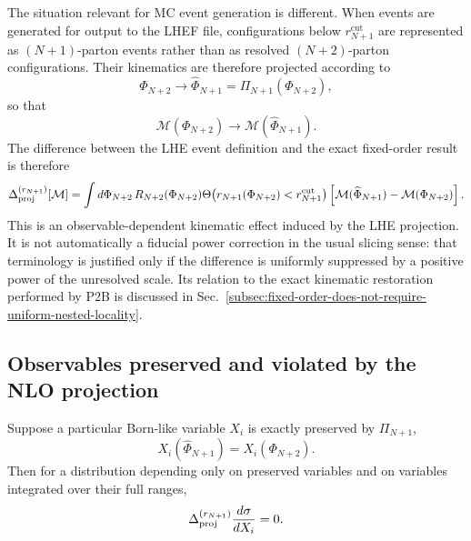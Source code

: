 \documentclass[11pt]{article}
\newcommand{\rnp}{r_{N+1}}
\newcommand{\cut}{\mathrm{cut}}
\newcommand{\Ph}{\Phi}
\newcommand{\Mcal}{\mathcal{M}}
\begin{document}
The situation relevant for MC event generation is different. When events are generated for output to
the LHEF file, configurations below \(\rnp^{\cut}\) are represented as \((N+1)\)-parton events rather
than as resolved \((N+2)\)-parton configurations. Their kinematics are therefore projected according to
\begin{equation}
\Ph_{N+2}\to\widehat\Ph_{N+1}=\Pi_{N+1}(\Ph_{N+2}),
\label{eq:rnp-projection}
\end{equation}
so that
\begin{equation}
\Mcal(\Ph_{N+2})\to\Mcal(\widehat\Ph_{N+1}).
\label{eq:rnp-measurement-replacement}
\end{equation}
The difference between the LHE event definition and the exact fixed-order result is therefore
\begin{equation}
\Delta_{\rm proj}^{(\rnp)}[\Mcal]
=
\int d\Ph_{N+2}\,
R_{N+2}(\Ph_{N+2})
\Theta\!\left(\rnp(\Ph_{N+2})<\rnp^{\cut}\right)
\left[
\Mcal(\widehat\Ph_{N+1})-\Mcal(\Ph_{N+2})
\right].
\label{eq:rnp-proj-correction}
\end{equation}
This is an observable-dependent kinematic effect induced by the LHE projection. It is not automatically a
fiducial power correction in the usual slicing sense: that terminology is justified only if the difference is
uniformly suppressed by a positive power of the unresolved scale. Its relation to the exact kinematic
restoration performed by P2B is discussed in
Sec.~\ref{subsec:fixed-order-does-not-require-uniform-nested-locality}.

\subsection{Observables preserved and violated by the NLO projection}

Suppose a particular Born-like variable \(X_i\) is exactly preserved by \(\Pi_{N+1}\),
\begin{equation}
X_i(\widehat\Ph_{N+1})=X_i(\Ph_{N+2}).
\label{eq:x-preserved}
\end{equation}
Then for a distribution depending only on preserved variables and on variables integrated over their full ranges,
\begin{equation}
\Delta_{\rm proj}^{(\rnp)}
\frac{d\sigma}{dX_i}=0.
\label{eq:x-preserved-zero}
\end{equation}
\end{document}
